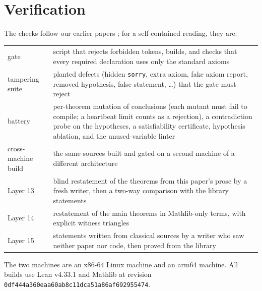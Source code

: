 \documentclass[11pt]{article}
\theoremstyle{definition}
\theoremstyle{remark}
\newcommand{\lean}[1]{\texttt{#1}}
\begin{document}
\section{Verification}\label{sec:verify}
The checks follow our earlier papers \cite{paperA,paperG}; for a self-contained reading, they are:
\begin{center}\small
\begin{tabular}{@{}l p{11.2cm}@{}}
\toprule
gate & script that rejects forbidden tokens, builds, and checks that every required declaration uses only
the standard axioms\\
tampering suite & planted defects (hidden \lean{sorry}, extra axiom, fake axiom report, removed
hypothesis, false statement, \ldots) that the gate must reject\\
battery & per-theorem mutation of conclusions (each mutant must fail to compile; a heartbeat limit
counts as a rejection), a contradiction probe on the hypotheses, a satisfiability certificate,
hypothesis ablation, and the unused-variable linter\\
cross-machine build & the same sources built and gated on a second machine of a different
architecture\\
Layer 13 & blind restatement of the theorems from this paper's prose by a fresh writer, then a
two-way comparison with the library statements\\
Layer 14 & restatement of the main theorems in Mathlib-only terms, with explicit witness triangles\\
Layer 15 & statements written from classical sources by a writer who saw neither paper nor code, then
proved from the library\\
\bottomrule
\end{tabular}
\end{center}
The two machines are an x86-64 Linux machine and an arm64 machine. All builds use Lean v4.33.1 and
Mathlib at revision \texttt{0df444a360eaa60ab8c11dca51a86af692955474}.
\end{document}
